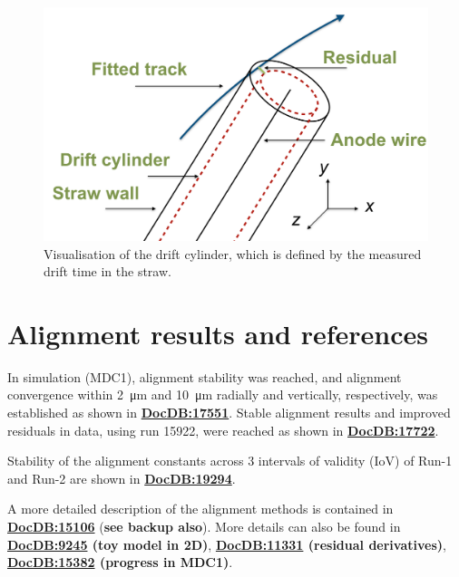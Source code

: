 \documentclass[12pt]{article}
\begin{document}
\begin{figure}[tbp]
\centering
\includegraphics[scale = 0.45]{fig/DriftCylinder.png}  
    \caption{Visualisation of the drift cylinder, which is defined by the measured drift time in the straw.}
\label{fig:DriftCylinder} 
\end{figure}

\section{Alignment results and references}
In simulation (MDC1), alignment stability was reached, and alignment convergence within \SI{2}{\micro\metre} and \SI{10}{\micro\metre} radially and vertically, respectively, was established as shown in \textbf{\href{https://gm2-docdb.fnal.gov/cgi-bin/private/ShowDocument?docid=17551}{DocDB:17551}}. Stable alignment results and improved residuals in data, using run 15922, were reached as shown in \textbf{\href{https://gm2-docdb.fnal.gov/cgi-bin/private/ShowDocument?docid=17722}{DocDB:17722}}.

Stability of the alignment constants across 3 intervals of validity (IoV) of Run-1 and Run-2 are shown in \textbf{\href{https://gm2-docdb.fnal.gov/cgi-bin/private/ShowDocument?docid=19294}{DocDB:19294}}.

A more detailed description of the alignment methods is contained in \textbf{\href{https://gm2-docdb.fnal.gov/cgi-bin/private/ShowDocument?docid=15106}{DocDB:15106}} (\textbf{see backup also}). More details can also be found in \textbf{\href{https://gm2-docdb.fnal.gov/cgi-bin/private/ShowDocument?docid=9245}{DocDB:9245} (toy model in 2D)}, \textbf{\href{https://gm2-docdb.fnal.gov/cgi-bin/private/ShowDocument?docid=11331}{DocDB:11331} (residual derivatives)}, \textbf{\href{https://gm2-docdb.fnal.gov/cgi-bin/private/ShowDocument?docid=15382}{DocDB:15382} (progress in MDC1)}. 
\end{document}
